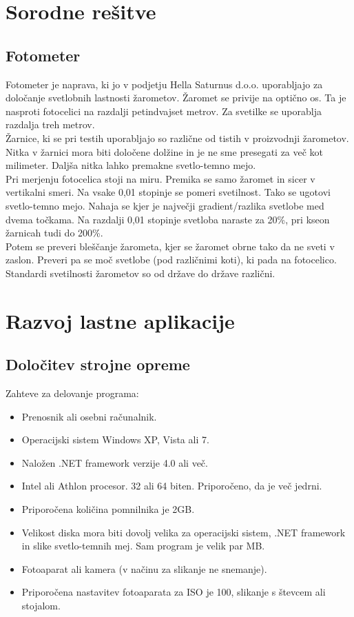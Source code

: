 \documentclass[oneside, a4paper, 12pt]{book}
\begin{document}
\chapter{Sorodne rešitve}
\section{Fotometer}
Fotometer je naprava, ki jo v podjetju Hella Saturnus d.o.o. uporabljajo za določanje svetlobnih lastnosti žarometov. Žaromet se privije na optično os. Ta je nasproti fotocelici na razdalji petindvajset metrov. Za svetilke se uporablja razdalja treh metrov. \\
Žarnice, ki se pri testih uporabljajo so različne od tistih v proizvodnji žarometov. Nitka v žarnici mora biti določene dolžine in je ne sme presegati za več kot milimeter. Daljša nitka lahko premakne svetlo-temno mejo.\\
Pri merjenju fotocelica stoji na miru. Premika se samo žaromet in sicer v vertikalni smeri. Na vsake 0,01 stopinje se pomeri svetilnost. Tako se ugotovi svetlo-temno mejo. Nahaja se kjer je največji gradient/razlika svetlobe med dvema točkama. Na razdalji 0,01 stopinje svetloba naraste za 20\%, pri kseon žarnicah tudi do 200\%.\\
Potem se preveri bleščanje žarometa, kjer se žaromet obrne tako da ne sveti v zaslon. Preveri pa se moč svetlobe (pod različnimi koti), ki pada na fotocelico.   \\
Standardi svetilnosti žarometov so od države do države različni. 

\chapter{Razvoj lastne aplikacije}
\section{Določitev strojne opreme}
Zahteve za delovanje programa:
\begin{itemize}
\item Prenosnik ali osebni računalnik.
\item Operacijski sistem Windows XP, Vista ali 7.
\item Naložen .NET framework verzije 4.0 ali več.
\item Intel ali Athlon procesor. 32 ali 64 biten. Priporočeno, da je več jedrni.
\item Priporočena količina pomnilnika je 2GB.
\item Velikost diska mora biti dovolj velika za operacijski sistem, .NET framework in slike svetlo-temnih mej. Sam program je velik par MB. 
\item Fotoaparat ali kamera (v načinu za slikanje ne snemanje).
\item Priporočena nastavitev fotoaparata za ISO je 100, slikanje s števcem ali stojalom.
\end{itemize}
\end{document}
